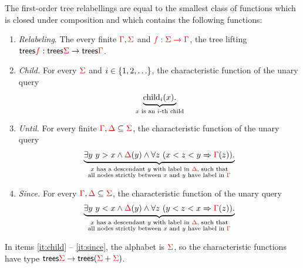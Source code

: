 \begin{lemma}\label{lem:schlingloff} The first-order tree relabellings are equal to the smallest class of functions which is closed under composition and which  contains the following functions:
    \begin{enumerate}
        \item \label{it:relabeling} \emph{Relabeling}. The every finite ${\color{red}{\Gamma}},{\color{red}{\Sigma}}$ and ${\color{red}{f : {\color{red}{\Sigma}}\to {\color{red}{\Gamma}}}}$, the tree lifting $\mathsf {trees} {\color{red}{f}} : \mathsf {trees} {\color{red}{\Sigma}} \to \mathsf {trees} {\color{red}{\Gamma}}$.
        \item \label{it:child} \emph{Child.} For every ${\color{red}{\Sigma}}$ and  $i \in \{1,2,\ldots\}$, the characteristic function of the  unary query 
        \begin{align*}
            \underbrace{\mathrm{child}_{i} (x).}_{\text{$x$ is an $i$-th child}}
        \end{align*}
         \item \label{it:until} \emph{Until.} For every finite ${\color{red}{\Gamma}}, {\color{red}{\Delta}} \subseteq {\color{red}{\Sigma}}$,  the characteristic function of the unary query
         \begin{align*}
              \underbrace{\exists y\ y > x \land {\color{red}{\Delta}}(y) \land  \forall z \ (x < z < y \Rightarrow {\color{red}{\Gamma}}(z)).}_{\substack{\text{$x$ has a descendant $y$ with label in ${\color{red}{\Delta}}$, such that}\\ \text{all nodes strictly between $x$ and $y$ have label in ${\color{red}{\Gamma}}$}}} 
         \end{align*} 
         \item \label{it:since}\emph{Since.} For every ${\color{red}{\Gamma}}, {\color{red}{\Delta}} \subseteq {\color{red}{\Sigma}}$,    the characteristic function of the unary query
         \begin{align*}
              \underbrace{\exists y\ y < x \land {\color{red}{\Delta}}(y) \land  \forall z \ (y < z < x \Rightarrow {\color{red}{\Gamma}}(z)).}_{\substack{\text{$x$ has a descendant $y$ with label in ${\color{red}{\Delta}}$, such that}\\ \text{all nodes strictly between $x$ and $y$ have label in ${\color{red}{\Gamma}}$}}}  
         \end{align*} 
    \end{enumerate}
    In items \ref{it:child} -- \ref{it:since}, the alphabet is ${\color{red}{\Sigma}}$, so the characteristic functions have type $\mathsf {trees} {\color{red}{\Sigma}} \to \mathsf {trees}({\color{red}{\Sigma}} + {\color{red}{\Sigma}})$. 
\end{lemma}


